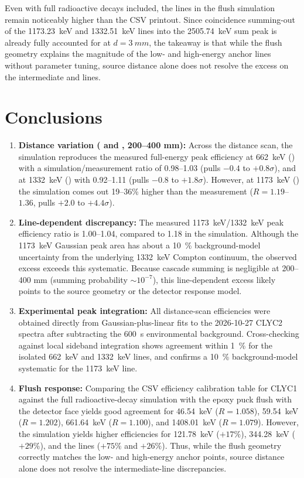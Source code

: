 \documentclass[11pt,a4paper]{article}
\begin{document}
Even with full radioactive decays included, the  lines in the flush simulation remain noticeably higher than the CSV printout. Since coincidence summing-out of the \SI{1173.23}{keV} and \SI{1332.51}{keV} lines into the \SI{2505.74}{keV} sum peak is already fully accounted for at $d=\SI{3}{mm}$, the takeaway is that while the flush geometry explains the magnitude of the low- and high-energy anchor lines without parameter tuning, source distance alone does not resolve the excess on the intermediate  and  lines.

\section{Conclusions}
\begin{enumerate}
\setlength{\itemsep}{0pt}
  \item \textbf{Distance variation ( and , 200--400 mm):} Across the distance scan, the simulation reproduces the measured full-energy peak efficiency at \SI{662}{keV} () with a simulation/measurement ratio of 0.98--1.03 (pulls $-0.4$ to $+0.8\sigma$), and at \SI{1332}{keV} () with 0.92--1.11 (pulls $-0.8$ to $+1.8\sigma$). However, at \SI{1173}{keV} () the simulation comes out 19--36\% higher than the measurement ($R=1.19$--$1.36$, pulls $+2.0$ to $+4.4\sigma$).
  \item \textbf{Line-dependent  discrepancy:} The measured \SI{1173}{keV}/\SI{1332}{keV} peak efficiency ratio is 1.00--1.04, compared to 1.18 in the simulation. Although the \SI{1173}{keV} Gaussian peak area has about a \SI{10}{\percent} background-model uncertainty from the underlying \SI{1332}{keV} Compton continuum, the observed excess exceeds this systematic. Because cascade summing is negligible at 200--400 mm (summing probability $\sim10^{-7}$), this line-dependent excess likely points to the  source geometry or the detector response model.
  \item \textbf{Experimental peak integration:} All distance-scan efficiencies were obtained directly from Gaussian-plus-linear fits to the 2026-10-27 CLYC2 spectra after subtracting the \SI{600}{s} environmental background. Cross-checking against local sideband integration shows agreement within \SI{1}{\percent} for the isolated \SI{662}{keV} and \SI{1332}{keV} lines, and confirms a \SI{10}{\percent} background-model systematic for the \SI{1173}{keV} line.
  \item \textbf{Flush response:} Comparing the CSV efficiency calibration table for CLYC1 against the full radioactive-decay simulation with the epoxy puck flush with the detector face yields good agreement for \SI{46.54}{keV} ($R=1.058$), \SI{59.54}{keV} ($R=1.202$), \SI{661.64}{keV} ($R=1.100$), and \SI{1408.01}{keV} ($R=1.079$). However, the simulation yields higher efficiencies for \SI{121.78}{keV} ($+17\%$), \SI{344.28}{keV} ($+29\%$), and the  lines ($+75\%$ and $+26\%$). Thus, while the flush geometry correctly matches the low- and high-energy anchor points, source distance alone does not resolve the intermediate-line discrepancies.

\end{enumerate}
\end{document}
